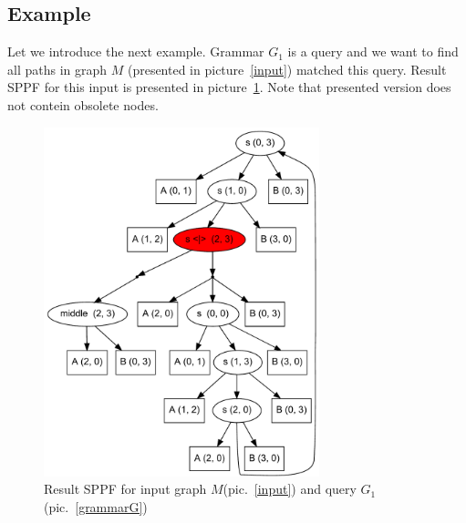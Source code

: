 \subsection{Example}

Let we introduce the next example. Grammar $G_1$ is a query and we want to find all paths in graph $M$ (presented in picture~\ref{input}) matched this query.
Result SPPF for this input is presented in picture~\ref{SPPF}. Note that presented version does not contein obsolete nodes.

\begin{figure}[h]
    \begin{center}
        \includegraphics[width=8cm]{dot/AnBn.pdf}
        \caption{Result SPPF for input graph $M$(pic.~\ref{input}) and query $G_1$(pic.~\ref{grammarG})}
        \label{SPPF}        
    \end{center}
\end{figure}

